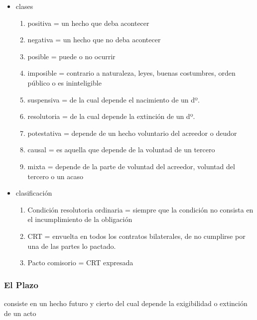 \documentclass[]{article}
\providecommand{\tightlist}{%
  \setlength{\itemsep}{0pt}\setlength{\parskip}{0pt}}
\begin{document}
\begin{itemize}
\tightlist
\item
  clases

  \begin{enumerate}
  \def\labelenumi{\arabic{enumi}.}
  \tightlist
  \item
    positiva = un hecho que deba acontecer
  \item
    negativa = un hecho que no deba acontecer
  \item
    posible = puede o no ocurrir
  \item
    imposible = contrario a naturaleza, leyes, buenas costumbres, orden
    público o es ininteligible
  \item
    suspensiva = de la cual depende el nacimiento de un dº.
  \item
    resolutoria = de la cual depende la extinción de un dº.
  \item
    potestativa = depende de un hecho voluntario del acreedor o deudor
  \item
    causal = es aquella que depende de la voluntad de un tercero
  \item
    mixta = depende de la parte de voluntad del acreedor, voluntad del
    tercero o un acaso
  \end{enumerate}
\item
  clasificación

  \begin{enumerate}
  \def\labelenumi{\arabic{enumi}.}
  \tightlist
  \item
    Condición resolutoria ordinaria = siempre que la condición no
    consista en el incumplimiento de la obligación
  \item
    CRT = envuelta en todos los contratos bilaterales, de no cumplirse
    por una de las partes lo pactado.
  \item
    Pacto comisorio = CRT expresada
  \end{enumerate}
\end{itemize}

\hypertarget{el-plazo}{%
\subsubsection{El Plazo}\label{el-plazo}}

consiste en un hecho futuro y cierto del cual depende la exigibilidad o
extinción de un acto
\end{document}
